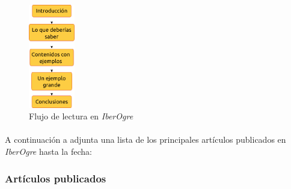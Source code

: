 \documentclass[16pt,spanish]{article}
\def \wiki{\emph{IberOgre} }
\begin{document}
\begin{figure}[H]
    \centering
        \includegraphics[width=2cm]{img/workflow-iberogre.png} 
    \caption{Flujo de lectura en \wiki}
    \label{img:workflow-iberogre}
\end{figure}

\paragraph{}
A continuación a adjunta una lista de los principales artículos publicados
en \wiki hasta la fecha:

\subsubsection{Artículos publicados}
\end{document}
